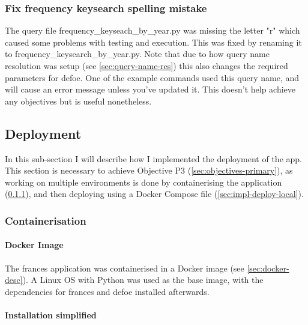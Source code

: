 \documentclass[12pt, letterpaper]{article}
\begin{document}
\subsubsection{Fix frequency keysearch spelling mistake}\label{sec:impl-spelling-mistake}

\begin{flushleft}
The query file frequency\_keyseach\_by\_year.py was missing the letter "r" which caused some problems with testing and execution. This was fixed by renaming it to frequency\_keysearch\_by\_year.py. Note that due to how query name resolution was setup (see \ref{sec:query-name-res}) this also changes the required parameters for defoe. One of the example commands used this query name, and will cause an error message unless you've updated it. This doesn't help achieve any objectives but is useful nonetheless.
\end{flushleft}

\subsection{Deployment}\label{sec:impl-deployment}

\begin{flushleft}
In this sub-section I will describe how I implemented the deployment of the app. This section is necessary to achieve Objective P3 (\ref{sec:objectives-primary}), as working on multiple environments is done by containerising the application (\ref{sec:impl-containerisation}), and then deploying using a Docker Compose file (\ref{sec:impl-deploy-local}).
\end{flushleft}

\subsubsection{Containerisation}\label{sec:impl-containerisation}

\paragraph{Docker Image}

\begin{flushleft}
The frances application was containerised in a Docker image (see \ref{sec:docker-desc}). A Linux OS with Python was used as the base image, with the dependencies for frances and defoe installed afterwards. 
\end{flushleft}

\paragraph{Installation simplified}
\end{document}
